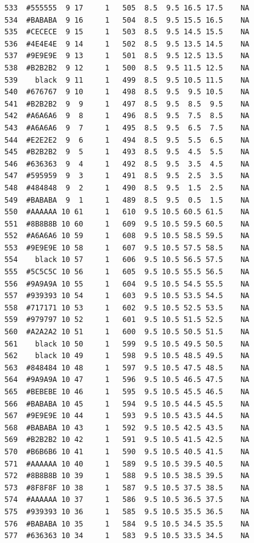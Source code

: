 \documentclass[12pt,twoside]{reedthesis}
\begin{document}
\begin{verbatim}
  533  #555555  9 17     1   505  8.5  9.5 16.5 17.5    NA
  534  #BABABA  9 16     1   504  8.5  9.5 15.5 16.5    NA
  535  #CECECE  9 15     1   503  8.5  9.5 14.5 15.5    NA
  536  #4E4E4E  9 14     1   502  8.5  9.5 13.5 14.5    NA
  537  #9E9E9E  9 13     1   501  8.5  9.5 12.5 13.5    NA
  538  #B2B2B2  9 12     1   500  8.5  9.5 11.5 12.5    NA
  539    black  9 11     1   499  8.5  9.5 10.5 11.5    NA
  540  #676767  9 10     1   498  8.5  9.5  9.5 10.5    NA
  541  #B2B2B2  9  9     1   497  8.5  9.5  8.5  9.5    NA
  542  #A6A6A6  9  8     1   496  8.5  9.5  7.5  8.5    NA
  543  #A6A6A6  9  7     1   495  8.5  9.5  6.5  7.5    NA
  544  #E2E2E2  9  6     1   494  8.5  9.5  5.5  6.5    NA
  545  #B2B2B2  9  5     1   493  8.5  9.5  4.5  5.5    NA
  546  #636363  9  4     1   492  8.5  9.5  3.5  4.5    NA
  547  #595959  9  3     1   491  8.5  9.5  2.5  3.5    NA
  548  #484848  9  2     1   490  8.5  9.5  1.5  2.5    NA
  549  #BABABA  9  1     1   489  8.5  9.5  0.5  1.5    NA
  550  #AAAAAA 10 61     1   610  9.5 10.5 60.5 61.5    NA
  551  #8B8B8B 10 60     1   609  9.5 10.5 59.5 60.5    NA
  552  #A6A6A6 10 59     1   608  9.5 10.5 58.5 59.5    NA
  553  #9E9E9E 10 58     1   607  9.5 10.5 57.5 58.5    NA
  554    black 10 57     1   606  9.5 10.5 56.5 57.5    NA
  555  #5C5C5C 10 56     1   605  9.5 10.5 55.5 56.5    NA
  556  #9A9A9A 10 55     1   604  9.5 10.5 54.5 55.5    NA
  557  #939393 10 54     1   603  9.5 10.5 53.5 54.5    NA
  558  #717171 10 53     1   602  9.5 10.5 52.5 53.5    NA
  559  #979797 10 52     1   601  9.5 10.5 51.5 52.5    NA
  560  #A2A2A2 10 51     1   600  9.5 10.5 50.5 51.5    NA
  561    black 10 50     1   599  9.5 10.5 49.5 50.5    NA
  562    black 10 49     1   598  9.5 10.5 48.5 49.5    NA
  563  #848484 10 48     1   597  9.5 10.5 47.5 48.5    NA
  564  #9A9A9A 10 47     1   596  9.5 10.5 46.5 47.5    NA
  565  #BEBEBE 10 46     1   595  9.5 10.5 45.5 46.5    NA
  566  #BABABA 10 45     1   594  9.5 10.5 44.5 45.5    NA
  567  #9E9E9E 10 44     1   593  9.5 10.5 43.5 44.5    NA
  568  #BABABA 10 43     1   592  9.5 10.5 42.5 43.5    NA
  569  #B2B2B2 10 42     1   591  9.5 10.5 41.5 42.5    NA
  570  #B6B6B6 10 41     1   590  9.5 10.5 40.5 41.5    NA
  571  #AAAAAA 10 40     1   589  9.5 10.5 39.5 40.5    NA
  572  #8B8B8B 10 39     1   588  9.5 10.5 38.5 39.5    NA
  573  #8F8F8F 10 38     1   587  9.5 10.5 37.5 38.5    NA
  574  #AAAAAA 10 37     1   586  9.5 10.5 36.5 37.5    NA
  575  #939393 10 36     1   585  9.5 10.5 35.5 36.5    NA
  576  #BABABA 10 35     1   584  9.5 10.5 34.5 35.5    NA
  577  #636363 10 34     1   583  9.5 10.5 33.5 34.5    NA

\end{verbatim}
\end{document}

